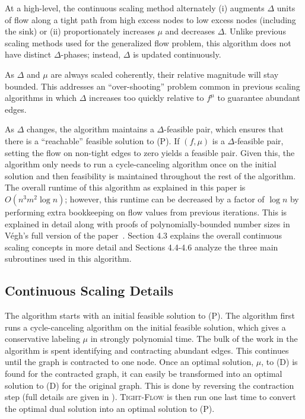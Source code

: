 \documentclass[11pt]{article}
\theoremstyle{definition}
\theoremstyle{definition}
\begin{document}
    At a high-level, the continuous scaling
    method alternately (i) augments $\Delta$ units of flow along a tight path from high
    excess nodes to low excess nodes (including the sink) or (ii) proportionately increases $\mu$ and
    decreases $\Delta$. Unlike previous scaling methods used for the generalized flow problem,
    this algorithm does not have distinct $\Delta$-phases; instead, $\Delta$ is updated continuously.
    
    As $\Delta$ and $\mu$ are always scaled coherently, their relative magnitude will stay bounded.
    This addresses an ``over-shooting'' problem common in previous scaling algorithms in which $\Delta$
    increases too quickly relative to $f^\mu$ to guarantee abundant edges.
    
    As $\Delta$ changes, the algorithm maintains a $\Delta$-feasible pair, which ensures that there is
    a ``reachable'' feasible solution to (P). If $(f,\mu)$ is a $\Delta$-feasible pair,
    setting the flow on non-tight edges to zero yields a feasible pair.
    Given this, the algorithm only needs to run a cycle-canceling
    algorithm once on the initial solution and then feasibility is maintained throughout the rest of
    the algorithm. The overall runtime of this algorithm as explained in this
    paper is $O(n^3 m^2 \log n)$; however, this runtime can be decreased by a factor of $\log n$
    by performing extra bookkeeping on flow values from previous iterations.
    This is explained in detail along with proofs of polynomially-bounded number sizes
    in Végh's full version of the paper~\cite{article}. Section 4.3 explains
    the overall continuous scaling concepts in more detail and Sections
    4.4-4.6 analyze the three main subroutines used in this algorithm.
	 
	\subsection{Continuous Scaling Details}
	The algorithm starts with an initial feasible solution to (P).
    The algorithm first runs a cycle-canceling algorithm on the initial feasible solution,
    which gives a conservative labeling $\mu$ in strongly polynomial time. The bulk of the
    work in the algorithm is spent identifying and contracting abundant edges. This continues
    until the graph is contracted to one node. Once an optimal solution, $\mu$, to (D)
    is found for the contracted graph, it can easily be transformed into an optimal solution to
    (D) for the original graph. This is done by reversing the contraction step (full details
    are given in \cite{article}). \textsc{Tight-Flow} is then run one last time to convert the
    optimal dual solution into an optimal solution to (P).
	
\end{document}
